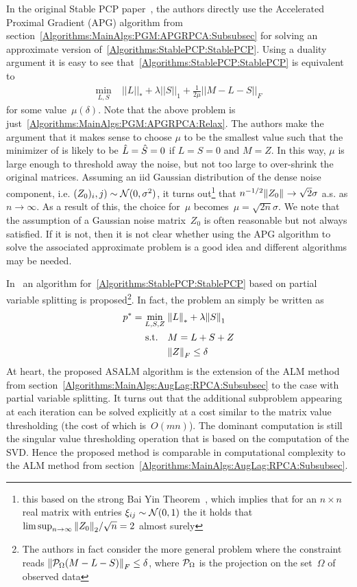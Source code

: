 \documentclass{../../common/projectreport}
\begin{document}
In the original Stable PCP paper~\cite{Zhou:2010vn}, the authors directly use the Accelerated Proximal Gradient (APG) algorithm from section~\ref{Algorithms:MainAlgs:PGM:APGRPCA:Subsubsec} for solving an approximate version of~\eqref{Algorithms:StablePCP:StablePCP}. Using a duality argument it is easy to see that~\eqref{Algorithms:StablePCP:StablePCP} is equivalent to
\begin{align*}
\min_{L,S} \; &||L||_* + \lambda ||S||_1 + \frac{1}{2\mu} ||M-L-S||_F
\end{align*}
for some value~$\mu(\delta)$. Note that the above problem is just~\eqref{Algorithms:MainAlgs:PGM:APGRPCA:Relax}. The authors make the argument that it makes sense to choose $\mu$ to be the smallest value such that the minimizer of is likely to be ${\hat{L}} = {\hat{S}} = 0$ if $L=S=0$ and $M=Z$. In this way, $\mu$ is large enough to threshold away the noise, but not too large to over-shrink the original matrices. Assuming an iid Gaussian distribution of the dense noise component, i.e. $(Z_0)_i,j) \sim {\mathcal{N}}(0,\sigma^2)$, it turns out\footnote{this based on the strong Bai Yin Theorem~\cite{Bai:1988fk}, which implies that for an $n\times n$ real matrix with entries $\xi_{ij} \sim {\mathcal{N}}(0,1)$ the it holds that $\limsup_{n\rightarrow \infty} {\left\|Z_0\right\|}_{2}^{}/\sqrt{n} = 2$ almost surely} that $n^{-1/2}{\left\|Z_0\right\|}_{}^{} \rightarrow \sqrt{2} \sigma$ a.s. as $n\rightarrow \infty$. As a result of this, the choice for~$\mu$ becomes~$\mu = \sqrt{2n}\sigma$. We note that the assumption of a Gaussian noise matrix~$Z_0$ is often reasonable but not always satisfied. If it is not, then it is not clear whether using the APG algorithm to solve the associated approximate problem is a good idea and different algorithms may be needed. 


In~\cite{Tao:2011vn} an algorithm for~\eqref{Algorithms:StablePCP:StablePCP} based on partial variable splitting is proposed\footnote{The authors in fact consider the more general problem where the constraint reads ${\left\|{\mathcal{P}}_\Omega (M - L - S)\right\|}_{F}^{} \leq \delta$, where ${\mathcal{P}}_\Omega$ is the projection on the set~$\Omega$ of observed data}. In fact, the problem an simply be written as 
%
\begin{align}
\begin{split}
p^* = \min_{L,S,Z} \; &{\left\|L\right\|}_{*}^{} + \lambda {\left\|S\right\|}_{1}^{} \\
\text{s.t.} \quad & M = L +  S + Z \\
&{\left\|Z\right\|}_{F}^{} \leq \delta
\end{split}
\label{Algorithms:StablePCP:PartialVarSplitting}
\end{align}
%
At heart, the proposed ASALM algorithm is the extension of the ALM method from section~\ref{Algorithms:MainAlgs:AugLag:RPCA:Subsubsec} to the case with partial variable splitting. It turns out that the additional subproblem appearing at each iteration can be solved explicitly at a cost similar to the matrix value thresholding (the cost of which is~$O(mn)$). The dominant computation is still the singular value thresholding operation that is based on the computation of the SVD. Hence the proposed method is comparable in computational complexity to the ALM method from section~\ref{Algorithms:MainAlgs:AugLag:RPCA:Subsubsec}.
\end{document}
